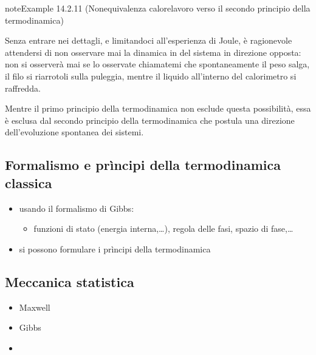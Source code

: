 \documentclass[letterpaper,10pt,italian]{jupyterBook}
\begin{document}
\begin{sphinxadmonition}{note}{Example 14.2.11 (Non\sphinxhyphen{}equivalenza calore\sphinxhyphen{}lavoro \sphinxhyphen{} verso il secondo principio della termodinamica)}



\sphinxAtStartPar
Senza entrare nei dettagli, e limitandoci all’esperienza di Joule, è ragionevole attendersi di non osservare mai la dinamica in del sistema in direzione opposta: non si osserverà mai \sphinxhyphen{} se lo osservate chiamatemi \sphinxhyphen{} che spontaneamente il peso salga, il filo si ri\sphinxhyphen{}arrotoli sulla puleggia, mentre il liquido all’interno del calorimetro si raffredda.

\sphinxAtStartPar
Mentre il primo principio della termodinamica non esclude questa possibilità, essa è esclusa dal secondo principio della termodinamica che postula una direzione dell’evoluzione spontanea dei sistemi.
\end{sphinxadmonition}


\subsection{Formalismo e prìncipi della termodinamica classica}
\label{\detokenize{ch/thermodynamics/foundation-experiments:formalismo-e-principi-della-termodinamica-classica}}\label{\detokenize{ch/thermodynamics/foundation-experiments:physics-hs-thermodynamics-foundation-experiments-gibbs}}
\sphinxAtStartPar
{}
\begin{itemize}
\item {} 
\sphinxAtStartPar
usando il formalismo di Gibbs:
\begin{itemize}
\item {} 
\sphinxAtStartPar
funzioni di stato (energia interna,…), regola delle fasi, spazio di fase,…

\end{itemize}

\item {} 
\sphinxAtStartPar
si possono formulare i prìncipi della termodinamica

\end{itemize}


\subsection{Meccanica statistica}
\label{\detokenize{ch/thermodynamics/foundation-experiments:meccanica-statistica}}\label{\detokenize{ch/thermodynamics/foundation-experiments:physics-hs-thermodynamics-foundation-experiments-stat-mech}}\begin{itemize}
\item {} 
\sphinxAtStartPar
Maxwell

\item {} 
\sphinxAtStartPar
Gibbs

\item {} 
\sphinxAtStartPar
{}

\end{itemize}
\end{document}

